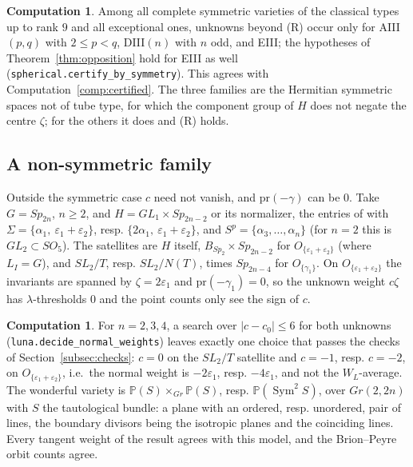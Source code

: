 \documentclass[11pt]{amsart}
\theoremstyle{definition}
\newtheorem{computation}[theorem]{Computation}
\theoremstyle{remark}
\newcommand{\code}[1]{\texttt{#1}}
\newcommand{\PP}{\mathbb{P}}
\newcommand{\pr}{\mathrm{pr}}
\begin{document}
\begin{computation}\label{comp:opposition}
Among all complete symmetric varieties of the classical types up to rank $9$
and all exceptional ones, unknowns beyond \textup{(R)} occur only for
AIII$(p,q)$ with $2\le p<q$, DIII$(n)$ with $n$ odd, and EIII; the hypotheses of
Theorem~\ref{thm:opposition} hold for EIII as well
(\code{spherical.certify\_by\_symmetry}). This agrees with
Computation~\ref{comp:certified}. The three families are the Hermitian
symmetric spaces not of tube type, for which the component group of $H$
does not negate the centre $\zeta$; for the others it does and (R) holds.
\end{computation}

\subsection{A non-symmetric family}\label{subsec:nonsymmetric}
Outside the symmetric case $c$ need not vanish, and $\pr(-\gamma)$ can be $0$.
Take $G=Sp_{2n}$, $n\ge2$, and $H=GL_1\times Sp_{2n-2}$ or its normalizer, the
entries of \cite[\S3]{BravPezReductive} with
$\Sigma=\{\alpha_1,\ \varepsilon_1+\varepsilon_2\}$, resp.
$\{2\alpha_1,\ \varepsilon_1+\varepsilon_2\}$, and $S^p=\{\alpha_3,\dots,\alpha_n\}$ (for
$n=2$ this is $GL_2\subset SO_5$). The satellites are $H$ itself,
$B_{Sp_2}\times Sp_{2n-2}$ for $O_{\{\varepsilon_1+\varepsilon_2\}}$ (where $L_I=G$), and
$SL_2/T$, resp. $SL_2/N(T)$, times $Sp_{2n-4}$ for $O_{\{\gamma_1\}}$. On
$O_{\{\varepsilon_1+\varepsilon_2\}}$ the invariants are spanned by $\zeta=2\varepsilon_1$ and
$\pr(-\gamma_1)=0$, so the unknown weight $c\zeta$ has $\lambda$-thresholds $0$
and the point counts only see the sign of $c$.

\begin{computation}\label{comp:nonsymmetric}
For $n=2,3,4$, a search over $|c-c_0|\le6$ for both unknowns
(\code{luna.decide\_normal\_weights}) leaves exactly one choice that passes
the checks of Section~\ref{subsec:checks}: $c=0$ on the $SL_2/T$ satellite
and $c=-1$, resp. $c=-2$, on $O_{\{\varepsilon_1+\varepsilon_2\}}$, i.e.\ the normal
weight is $-2\varepsilon_1$, resp. $-4\varepsilon_1$, and not the $W_L$-average.
The wonderful variety is $\PP(S)\times_{Gr}\PP(S)$, resp. $\PP(\operatorname{Sym}^2S)$,
over $Gr(2,2n)$ with $S$ the tautological bundle: a plane with an ordered,
resp. unordered, pair of lines, the boundary divisors being the isotropic
planes and the coinciding lines. Every tangent weight of the result agrees
with this model, and the Brion--Peyre orbit counts agree.
\end{computation}
\end{document}
